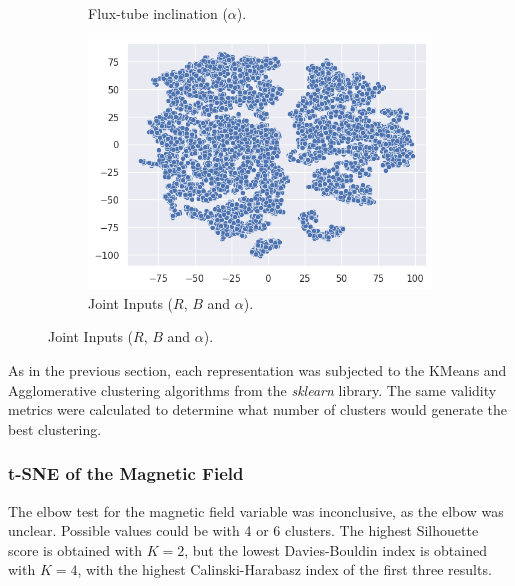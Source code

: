 \begin{figure}[h]
\begin{subfigure}[h]{0.329\textwidth}
        \caption{Flux-tube inclination ($\alpha$).}
        \label{fig:tsne_alpha_2d}
    \end{subfigure}
    \begin{subfigure}[h]{0.329\textwidth}
        \centering
        \includegraphics[width=\textwidth]{figures/tsne_joint_2d.png}
        \caption{Joint Inputs ($R$, $B$ and $\alpha$).}
        \label{fig:tsne_joint_2d}
    \end{subfigure}
\end{figure}

As in the previous section, each representation was subjected to the KMeans and Agglomerative clustering algorithms from the \textit{sklearn} library. The same validity metrics were calculated to determine what number of clusters would generate the best clustering.

\subsubsection{t-SNE of the Magnetic Field}\label{sec:tsne_b}
The elbow test for the magnetic field variable was inconclusive, as the elbow was unclear. Possible values could be with 4 or 6 clusters. The highest Silhouette score is obtained with $K=2$, but the lowest Davies-Bouldin index is obtained with $K=4$, with the highest Calinski-Harabasz index of the first three results. 


